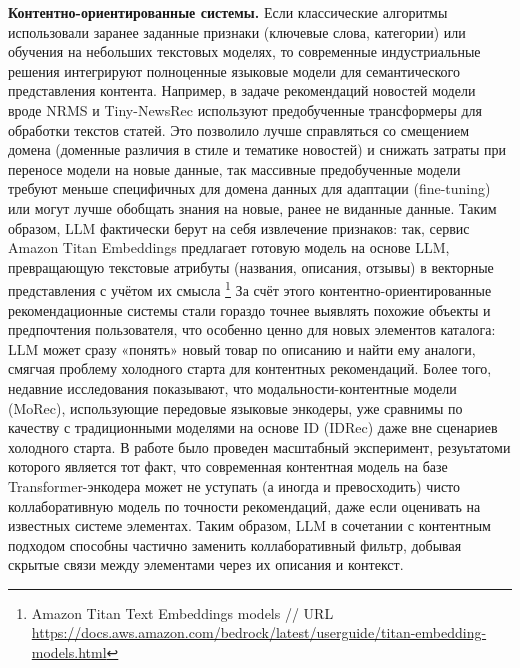 \textbf{Контентно-ориентированные системы.} Если классические алгоритмы использовали заранее заданные признаки (ключевые слова, категории) или обучения на небольших текстовых моделях, то современные индустриальные решения интегрируют полноценные языковые модели для семантического представления контента. Например, в задаче рекомендаций новостей модели вроде NRMS и Tiny-NewsRec используют предобученные трансформеры для обработки текстов статей. Это позволило лучше справляться со смещением домена (доменные различия в стиле и тематике новостей) и снижать затраты при переносе модели на новые данные, так массивные предобученные модели требуют меньше специфичных для домена данных для адаптации (fine-tuning) или могут лучше обобщать знания на новые, ранее не виданные данные. Таким образом, LLM фактически берут на себя извлечение признаков: так, сервис Amazon Titan Embeddings предлагает готовую модель на основе LLM, превращающую текстовые атрибуты (названия, описания, отзывы) в векторные представления с учётом их смысла \footnote{Amazon Titan Text Embeddings models // URL \url{https://docs.aws.amazon.com/bedrock/latest/userguide/titan-embedding-models.html}} За счёт этого контентно-ориентированные рекомендационные системы стали гораздо точнее выявлять похожие объекты и предпочтения пользователя, что особенно ценно для новых элементов каталога: LLM может сразу «понять» новый товар по описанию и найти ему аналоги, смягчая проблему холодного старта для контентных рекомендаций. Более того, недавние исследования показывают, что модальности-контентные модели (MoRec), использующие передовые языковые энкодеры, уже сравнимы по качеству с традиционными моделями на основе ID (IDRec) даже вне сценариев холодного старта. В работе \citep{yuan2023recommendersystemsidvs} было проведен масштабный эксперимент, резуьтатоми которого является тот факт, что современная контентная модель на базе Transformer-энкодера может не уступать (а иногда и превосходить) чисто коллаборативную модель по точности рекомендаций, даже если оценивать на известных системе элементах.  Таким образом, LLM в сочетании с контентным подходом способны частично заменить коллаборативный фильтр, добывая скрытые связи между элементами через их описания и контекст.

